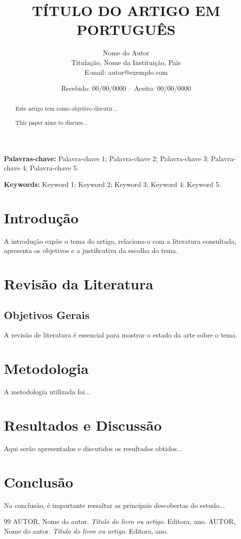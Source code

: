 \documentclass[12pt]{article} %
\title{TÍTULO DO ARTIGO EM PORTUGUÊS} %
\author{Nome do Autor\\ Titulação, Nome da Instituição, País\\ E-mail: autor@exemplo.com}
\date{Recebido: 00/00/0000 – Aceito: 00/00/0000} %
\begin{document}
\maketitle

\begin{abstract}
    \noindent Este artigo tem como objetivo discutir...
\end{abstract}

\textbf{Palavras-chave:} Palavra-chave 1; Palavra-chave 2; Palavra-chave 3; Palavra-chave 4; Palavra-chave 5.

\begin{abstract}
    \noindent This paper aims to discuss...
\end{abstract}

\textbf{Keywords:} Keyword 1; Keyword 2; Keyword 3; Keyword 4; Keyword 5.

\section{Introdução}
A introdução expõe o tema do artigo, relaciona-o com a literatura consultada, apresenta os objetivos e a justificativa da escolha do tema.

\section{Revisão da Literatura}
\subsection{Objetivos Gerais}
A revisão de literatura é essencial para mostrar o estado da arte sobre o tema.

\section{Metodologia}
A metodologia utilizada foi...

\section{Resultados e Discussão}
Aqui serão apresentados e discutidos os resultados obtidos...

\section{Conclusão}
Na conclusão, é importante ressaltar as principais descobertas do estudo...

\begin{thebibliography}{99}
     AUTOR, Nome do autor. \textit{Título do livro ou artigo}. Editora, ano.
     AUTOR, Nome do autor. \textit{Título do livro ou artigo}. Editora, ano.
\end{thebibliography}
\end{document}
